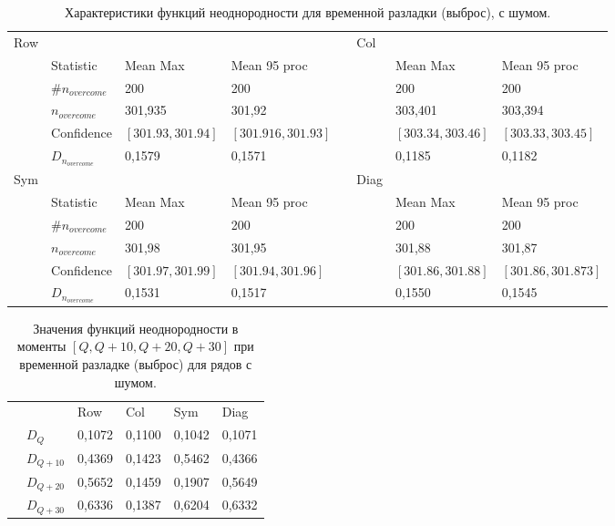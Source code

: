 \documentclass[specialist, substylefile = spbu.rtx,
			   subf, href, 12pt]{disser}
\begin{document}
\newpage
\begin{table}[!hhh]
	\center
	\small
	\caption{Характеристики функций неоднородности для временной разладки (выброс), с шумом.}
	\begin{tabular}{llllllll}
		Row & 				   & 		  	  & 			 && Col & 		      & 			      \\
		& Statistic        & Mean Max 	  & Mean 95 proc && 	& Mean Max     & Mean 95 proc     \\
		& $\#n_{overcome}$ & 200 	  	  & 200 		 &&     & 200 	      & 200 			  \\
		& $n_{overcome}$   & 301,935   	  & 301,92      &&     & 303,401       & 303,394		  \\
		& Confidence       & $[301.93, 301.94]$& $[301.916, 301.93]$&&     & $[303.34, 303.46]$ & $[303.33, 303.45]$     \\
		&$D_{n_{overcome}}$& 0,1579	  &	0,1571		 &&     & 0,1185  &   0,1182        \\
		Sym & 				   & 		  	  & 			 && Diag& 		      & 			      \\
		& Statistic        & Mean Max 	  & Mean 95 proc && 	& Mean Max     & Mean 95 proc     \\
		& $\#n_{overcome}$ & 200 	  	  & 200 		 &&     & 200 	      & 200 			  \\
		& $n_{overcome}$   & 301,98   	  & 301,95      &&     & 301,88      & 301,87 		  \\
		& Confidence       & $[301.97, 301.99]$ & $[301.94, 301.96]$ &&     & $[301.86, 301.88]$ & $[301.86, 301.873]$     \\
		&$D_{n_{overcome}}$& 0,1531		  &	0,1517		 &&     & 0,1550		 & 0,1545          \\
	\end{tabular}
	\label{tab:TemporaryHeterogeneityNoisedOutlier}
\end{table}

\begin{table}[!hhh]
	\center
	\caption{Значения функций неоднородности в моменты $[Q, Q+10, Q+20, Q+30]$ при временной разладке  (выброс) для рядов с шумом.}
	\begin{tabular}{llllll}
		&              & Row 	  & Col 	& Sym    & Diag  \\
		& $D_Q$        & 0,1072	  & 0,1100 	& 0,1042 & 0,1071		\\
		& $D_{Q+10}$   & 0,4369   & 0,1423  & 0,5462 & 0,4366	\\
		& $D_{Q+20}$   & 0,5652   & 0,1459  & 0,1907 & 0,5649	\\
		& $D_{Q+30}$   & 0,6336	  &	0,1387	& 0,6204 & 0,6332	
	\end{tabular}
	\label{tab:TemporaryHeterogeneityNoisedOutlierValues}
\end{table}
\end{document}
